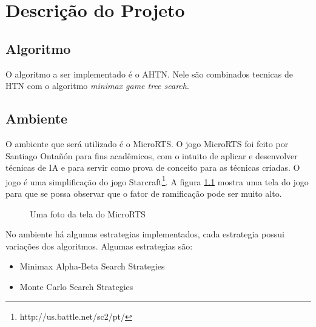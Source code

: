 \chapter{\label{chap:descr}Descrição do Projeto}

\section{Algoritmo}
O algoritmo a ser implementado é o AHTN. Nele são combinados tecnicas de HTN com o algoritmo \textit{minimax game tree search}. 

\section{Ambiente}

O ambiente que será utilizado é o MicroRTS.  O jogo MicroRTS foi feito por Santiago Ontañón \cite{ontanon2013combinatorial} para fins acadêmicos, com o intuito de aplicar e desenvolver técnicas de IA e para servir como prova de conceito para as técnicas criadas.  O jogo é uma simplificação do jogo Starcraft\footnote{http://us.battle.net/sc2/pt/}.
A figura \ref{fig:microrts} mostra uma tela do jogo para que se possa observar que o fator de ramificação pode ser muito alto.

\begin{figure}[ht]
	\centering
	\caption{Uma foto da tela do MicroRTS}
	\label{fig:microrts}
\end{figure} 

No ambiente há algumas estrategias implementados, cada estrategia possui variações dos algoritmos. Algumas estrategias são:
\begin{itemize}
	\item Minimax Alpha-Beta Search Strategies
	\item Monte Carlo Search Strategies
\end{itemize}
